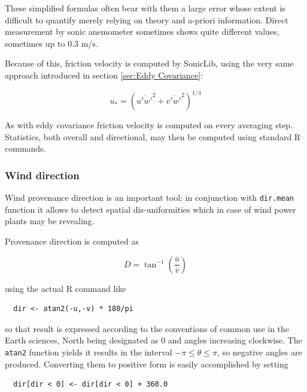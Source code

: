 \documentclass[a4paper,10pt]{book}
\begin{document}
These simplified formulas often bear with them a large error whose extent is difficult to quantify merely relying on theory and a-priori information. Direct measurement by sonic anemometer sometimes shows quite different values, sometimes up to 0.3 $\mbox{m}/\mbox{s}$.

Because of this, friction velocity is computed by SonicLib, using the very same approach introduced in section \ref{sec:Eddy Covariance}:

\begin{equation}\label{eq:Friction Velocity for Wind Power}
  u_{*} = \left( \overline{u'w'}^{2} + \overline{v'w'}^{2} \right)^{1/4} 
\end{equation}

As with eddy covariance friction velocity is computed on every averaging step. Statistics, both overall and directional, may then be computed using standard R commands.

\subsubsection{Wind direction}

Wind provenance direction is an important tool: in conjunction with \verb|dir.mean| function it allows to detect spatial dis-uniformities which in case of wind power plants may be revealing.

Provenance direction is computed as

\begin{equation}\label{eq:Direction in wind power}
  D = \tan^{-1}\left( \frac{\overline{u}}{\overline{v}} \right) 
\end{equation}

\noindent using the actual R command like

\begin{verbatim}
  dir <- atan2(-u,-v) * 180/pi
\end{verbatim}

\noindent so that result is expressed according to the conventions of common use in the Earth sciences, North being designated as 0 and angles increasing clockwise. The \verb|atan2| function yields it results in the interval $-\pi \le \theta \le \pi$, so negative angles are produced. Converting them to positive form is easily accomplished by setting

\begin{verbatim}
  dir[dir < 0] <- dir[dir < 0] + 360.0
\end{verbatim}
\end{document}

